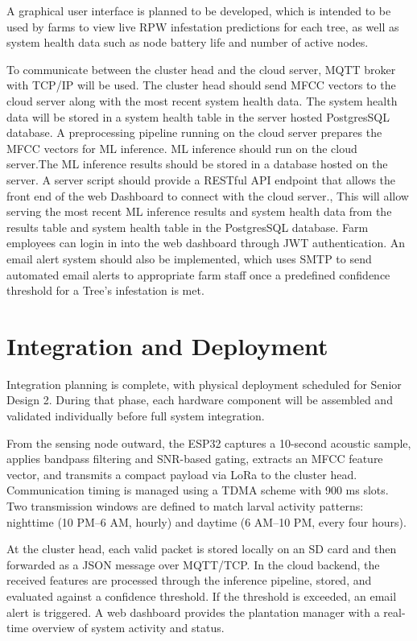 \documentclass[12pt,a4paper,oneside]{memoir}
\begin{document}
A graphical user interface is planned to be developed, which is intended to be used by farms to view live RPW infestation predictions for each tree, as well as system health data such as node battery life and number of active nodes. 

To communicate between the cluster head and the cloud server,  MQTT broker with TCP/IP will be used. The cluster head should send MFCC vectors to the cloud server along with the most recent system health data. The system health data will be stored in a  system health table in the server hosted PostgresSQL database. A preprocessing pipeline running on the cloud server prepares the MFCC vectors for ML inference. ML inference should run on the cloud server.The ML inference results should be stored in a database hosted on the server. A server script should provide a RESTful API endpoint that allows  the front end of the web Dashboard  to connect with the cloud server., This will allow serving the most recent ML inference results and system health data from the results table and system health table in the PostgresSQL database. Farm employees can login in into the web dashboard through JWT authentication. An email alert system should also be implemented, which uses  SMTP to send automated email alerts to appropriate farm staff  once a predefined confidence threshold for a Tree's infestation is met.

\section{Integration and Deployment}
\label{sec:IntegrationDeployment}

Integration planning is complete, with physical deployment scheduled for Senior Design 2. During that phase, each hardware component will be assembled and validated individually before full system integration.

From the sensing node outward, the ESP32 captures a 10-second acoustic sample, applies bandpass filtering and SNR-based gating, extracts an MFCC feature vector, and transmits a compact payload via LoRa to the cluster head. Communication timing is managed using a TDMA scheme with 900 ms slots. Two transmission windows are defined to match larval activity patterns: nighttime (10 PM--6 AM, hourly) and daytime (6 AM--10 PM, every four hours).

At the cluster head, each valid packet is stored locally on an SD card and then forwarded as a JSON message over MQTT/TCP. In the cloud backend, the received features are processed through the inference pipeline, stored, and evaluated against a confidence threshold. If the threshold is exceeded, an email alert is triggered. A web dashboard provides the plantation manager with a real-time overview of system activity and status.
\end{document}
